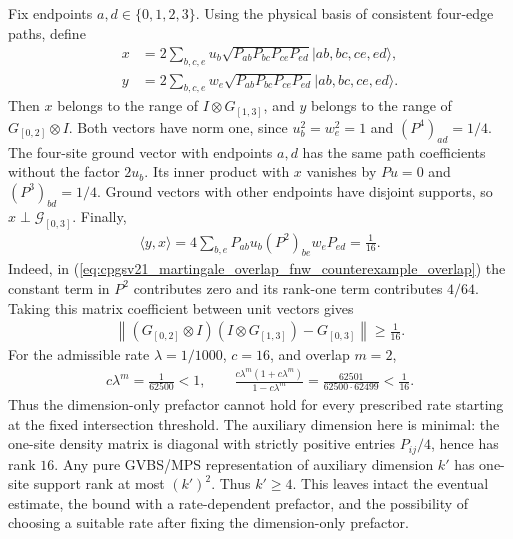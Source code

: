 \documentclass{article}
\begin{document}
Fix endpoints $a,d\in\{0,1,2,3\}$. Using the physical basis of consistent
four-edge paths, define
\begin{align}
    x & =2\sum_{b,c,e}u_b\sqrt{P_{ab}P_{bc}P_{ce}P_{ed}}
    |ab,bc,ce,ed\rangle,                                 \\
    y & =2\sum_{b,c,e}w_e\sqrt{P_{ab}P_{bc}P_{ce}P_{ed}}
    |ab,bc,ce,ed\rangle.
    \label{eq:cpgsv21_martingale_overlap_fnw_counterexample_vectors}
\end{align}
Then $x$ belongs to the range of $I\otimes G_{[1,3]}$, and $y$ belongs to
the range of $G_{[0,2]}\otimes I$. Both vectors have norm one, since
$u_b^2=w_e^2=1$ and $(P^4)_{ad}=1/4$. The four-site ground vector with
endpoints $a,d$ has the same path coefficients without the factor $2u_b$.
Its inner product with $x$ vanishes by $Pu=0$ and $(P^3)_{bd}=1/4$.
Ground vectors with other endpoints have disjoint supports, so
$x\perp\mathcal G_{[0,3]}$. Finally,
\begin{align}
    \langle y,x\rangle
    =4\sum_{b,e}P_{ab}u_b(P^2)_{be}w_eP_{ed}=\frac1{16}.
    \label{eq:cpgsv21_martingale_overlap_fnw_counterexample_overlap}
\end{align}
Indeed, in (\ref{eq:cpgsv21_martingale_overlap_fnw_counterexample_overlap})
the constant term in $P^2$ contributes zero and its rank-one term
contributes $4/64$. Taking this matrix coefficient between unit vectors gives
\begin{align}
    \left\|(G_{[0,2]}\otimes I)(I\otimes G_{[1,3]})-G_{[0,3]}\right\|
    \geq\frac1{16}.
    \label{eq:cpgsv21_martingale_overlap_fnw_counterexample_defect}
\end{align}
For the admissible rate $\lambda=1/1000$, $c=16$, and overlap $m=2$,
\begin{align}
    c\lambda^m=\frac1{62500}<1,\qquad
    \frac{c\lambda^m(1+c\lambda^m)}{1-c\lambda^m}
    =\frac{62501}{62500\cdot62499}<\frac1{16}.
    \label{eq:cpgsv21_martingale_overlap_fnw_counterexample_coefficient}
\end{align}
Thus the dimension-only prefactor cannot hold for every prescribed rate
starting at the fixed intersection threshold. The auxiliary dimension here
is minimal: the one-site density matrix is diagonal with strictly positive
entries $P_{ij}/4$, hence has rank $16$. Any pure GVBS/MPS representation of
auxiliary dimension $k'$ has one-site support rank at most $(k')^2$.
Thus $k'\geq4$.
This leaves intact the eventual estimate, the bound with a rate-dependent
prefactor, and the possibility of choosing a suitable rate after fixing
the dimension-only prefactor.
\end{document}
